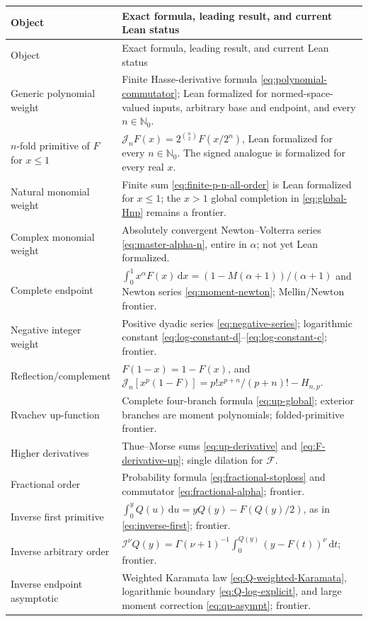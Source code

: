 \documentclass[11pt,oneside]{article}
\theoremstyle{definition}
\theoremstyle{remark}
\newcommand{\Fs}{\mathcal F}
\newcommand{\N}{\mathbb N}
\newcommand{\dd}{\,\mathrm d}
\newcommand{\Jn}{\mathcal J}
\newcommand{\RL}{\mathcal I}
\newcommand{\1}{\mathbf 1}
\begin{document}
\begin{longtable}{@{}p{}p{}@{}}
\toprule
Object & Exact formula, leading result, and current Lean status\\
\midrule
\endfirsthead
\toprule
Object & Exact formula, leading result, and current Lean status\\
\midrule
\endhead
Generic polynomial weight&
Finite Hasse-derivative formula \eqref{eq:polynomial-commutator}; Lean
formalized for normed-space-valued inputs, arbitrary base and endpoint, and
every \(n\in\N_0\).\\[1mm]
\(n\)-fold primitive of \(F\) for \(x\leq1\)&
\(\Jn_nF(x)=2^{\binom n2}F(x/2^n)\), Lean formalized for every
\(n\in\N_0\).  The signed analogue is formalized for every real \(x\).\\[1mm]
Natural monomial weight&
Finite sum \eqref{eq:finite-p-n-all-order} is Lean formalized for
\(x\leq1\); the \(x>1\) global completion in \eqref{eq:global-Hnp} remains a
frontier.\\[1mm]
Complex monomial weight&
Absolutely convergent Newton--Volterra series \eqref{eq:master-alpha-n}, entire
in \(\alpha\); not yet Lean formalized.\\[1mm]
Complete endpoint&
\(\int_0^1x^\alpha F(x)\dd x=(1-M(\alpha+1))/(\alpha+1)\) and
Newton series \eqref{eq:moment-newton}; Mellin/Newton frontier.\\[1mm]
Negative integer weight&
Positive dyadic series \eqref{eq:negative-series}; logarithmic constant
\eqref{eq:log-constant-d}--\eqref{eq:log-constant-c}; frontier.\\[1mm]
Reflection/complement&
\(F(1-x)=1-F(x)\), and
\(\Jn_n[x^p(1-F)]=p!x^{p+n}/(p+n)!-H_{n,p}\).\\[1mm]
Rvachev up-function&
Complete four-branch formula \eqref{eq:up-global}; exterior branches are
moment polynomials; folded-primitive frontier.\\[1mm]
Higher derivatives&
Thue--Morse sums \eqref{eq:up-derivative} and
\eqref{eq:F-derivative-up}; single dilation for \(\Fs\).\\[1mm]
Fractional order&
Probability formula \eqref{eq:fractional-stoploss} and commutator
\eqref{eq:fractional-alpha}; frontier.\\[1mm]
Inverse first primitive&
\(\int_0^yQ(u)\dd u=yQ(y)-F(Q(y)/2)\), as in
\eqref{eq:inverse-first}; frontier.\\[1mm]
Inverse arbitrary order&
\(\RL^\nu Q(y)=\Gamma(\nu+1)^{-1}\int_0^{Q(y)}(y-F(t))^\nu\dd t\);
frontier.\\[1mm]
Inverse endpoint asymptotic&
Weighted Karamata law \eqref{eq:Q-weighted-Karamata}, logarithmic boundary
\eqref{eq:Q-log-explicit}, and large moment correction \eqref{eq:qp-asympt};
frontier.\\
\bottomrule
\end{longtable}
\end{document}
